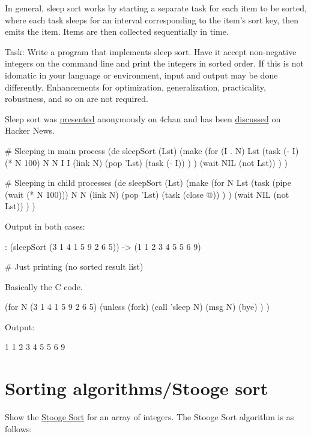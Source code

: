 \begin{itemize}
In general, sleep sort works by starting a separate task for each item
to be sorted, where each task sleeps for an interval corresponding to
the item's sort key, then emits the item. Items are then collected
sequentially in time.

Task: Write a program that implements sleep sort. Have it accept
non-negative integers on the command line and print the integers in
sorted order. If this is not idomatic in your language or environment,
input and output may be done differently. Enhancements for optimization,
generalization, practicality, robustness, and so on are not required.

Sleep sort was
\href{http://dis.4chan.org/read/prog/1295544154}{presented} anonymously
on 4chan and has been
\href{http://news.ycombinator.com/item?id=2657277}{discussed} on Hacker
News.


\begin{wideverbatim}

# Sleeping in main process
(de sleepSort (Lst)
   (make
      (for (I . N) Lst
         (task (- I) (* N 100)  N N  I I
            (link N)
            (pop 'Lst)
            (task (- I)) ) )
      (wait NIL (not Lst)) ) )

# Sleeping in child processes
(de sleepSort (Lst)
   (make
      (for N Lst
         (task (pipe (wait (* N 100))) N N
            (link N)
            (pop 'Lst)
            (task (close @)) ) )
      (wait NIL (not Lst)) ) )

Output in both cases:

: (sleepSort (3 1 4 1 5 9 2 6 5))
-> (1 1 2 3 4 5 5 6 9)

# Just printing (no sorted result list)

Basically the C code.

(for N (3 1 4 1 5 9 2 6 5)
   (unless (fork)
      (call 'sleep N)
      (msg N)
      (bye) ) )

Output:

1
1
2
3
4
5
5
6
9

\end{wideverbatim}

\pagebreak{}
\section*{Sorting algorithms/Stooge sort}

Show the \href{http://en.wikipedia.org/wiki/Stooge\_sort}{Stooge Sort}
for an array of integers. The Stooge Sort algorithm is as follows:


\end{itemize}
